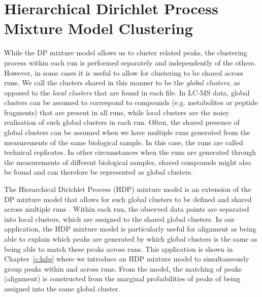 \section{Hierarchical Dirichlet Process Mixture Model Clustering\label{background-hdp-clustering}}

While the DP mixture model allows us to cluster related peaks, the clustering process within each run is performed separately and independently of the others. However, in some cases it is useful to allow for clustering to be shared across runs. We call the clusters shared in this manner to be the \emph{global clusters}, as opposed to the \emph{local clusters} that are found in each file. In LC-MS data, global clusters can be assumed to correspond to compounds (e.g. metabolites or peptide fragments) that are present in all runs, while local clusters are the noisy realisation of such global clusters in each run. Often, the shared presence of global clusters can be assumed when we have multiple runs generated from the measurements of the same biological sample. In this case, the runs are called technical replicates. In other circumstances when the runs are generated through the measurements of different biological samples, shared compounds might also be found and can therefore be represented as global clusters.

The Hierarchical Dirichlet Process (HDP) mixture model is an extension of the DP mixture model that allows for such global clusters to be defined and shared across multiple runs \cite{teh2012hierarchical}. Within each run, the observed data points are separated into local clusters, which are assigned to the shared global clusters. In our application, the HDP mixture model is particularly useful for alignment as being able to explain which peaks are generated by which global clusters is the same as being able to match these peaks across runs. This application is shown in Chapter~\ref{c:hdp} where we introduce an HDP mixture model to simultaneously group peaks within and across runs. From the model, the matching of peaks (alignment) is constructed from the marginal probabilities of peaks of being assigned into the same global cluster. 

